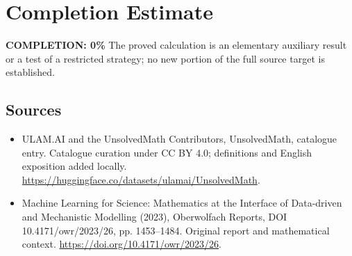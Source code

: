 \documentclass[11pt]{article}
\begin{document}
\section{Completion Estimate}
\noindent\textbf{COMPLETION: 0\%}
The proved calculation is an elementary auxiliary result or a test of a restricted strategy; no new portion of the full source target is established.

\subsection{Sources}
\begin{itemize}
\item[\hypertarget{source:statement:1}{S1}] ULAM.AI and the UnsolvedMath Contributors, UnsolvedMath, catalogue entry. Catalogue curation under CC BY 4.0; definitions and English exposition added locally.
\url{https://huggingface.co/datasets/ulamai/UnsolvedMath}.
\item[\hypertarget{source:statement:2}{S2}] Machine Learning for Science: Mathematics at the Interface of Data-driven and Mechanistic Modelling (2023), Oberwolfach Reports, DOI 10.4171/owr/2023/26, pp. 1453--1484. Original report and mathematical context.
\url{https://doi.org/10.4171/owr/2023/26}.
\end{itemize}
\label{end:statement}
\end{document}
